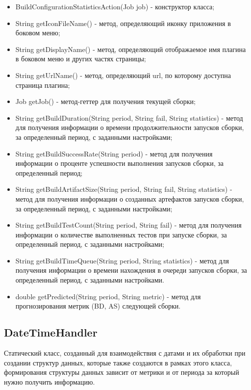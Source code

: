 \begin{itemize}
	\item BuildConfigurationStatisticsAction(Job job) - конструктор класса;
	\item String getIconFileName() - метод, определяющий иконку приложения в боковом меню;
	\item String getDisplayName() - метод, определяющий отображаемое имя плагина в боковом меню и других частях страницы;
	\item String getUrlName() - метод, определяющий url, по которому доступна страница плагина;
	\item Job getJob() - метод-геттер для получения текущей сборки;
	\item String getBuildDuration(String period, String fail, String statistics) - метод для получения информации о времени продолжительности запусков сборки, за определенный период, с заданными настройками;
	\item String getBuildSuccessRate(String period) - метод для получения информации о проценте успешности выполнения запусков сборки, за определенный период;
	\item String getBuildArtifactSize(String period, String fail, String statistics) - метод для получения информации о созданных артефактов запусков сборки, за определенный период, с заданными настройками;
	\item String getBuildTestCount(String period, String fail) - метод для получения информации о количестве выполненных тестов при запуске сборки, за определенный период, с заданными настройками;
	\item String getBuildTimeQueue(String period, String statistics) - метод для получения информации о времени нахождения в очереди запусков сборки, за определенный период, с заданными настройками.
	\item double getPredicted(String period, String metric) - метод для прогнозирования метрик (BD, AS) следующей сборки.
\end{itemize}

\subsection{DateTimeHandler}

Статический класс, созданный для взаимодействия с датами и их обработки при создании структур данных, которые также создаются в рамках этого класса, формирования структуры данных зависит от метрики и от периода за который нужно получить информацию.

